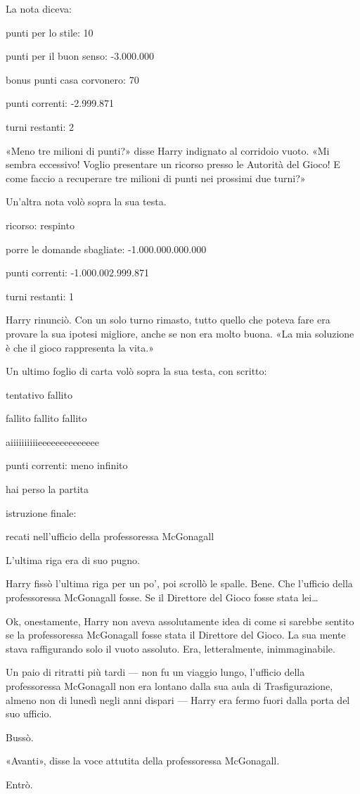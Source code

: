 La nota diceva:

punti per lo stile: 10

punti per il buon senso: -3.000.000

bonus punti casa corvonero: 70

punti correnti: -2.999.871

turni restanti: 2

«Meno tre milioni di punti?» disse Harry indignato al corridoio vuoto. «Mi sembra eccessivo! Voglio presentare un ricorso presso le Autorità del Gioco! E come faccio a recuperare tre milioni di punti nei prossimi due turni?»

Un’altra nota volò sopra la sua testa.

ricorso: respinto

porre le domande sbagliate: -1.000.000.000.000

punti correnti: -1.000.002.999.871

turni restanti: 1

Harry rinunciò. Con un solo turno rimasto, tutto quello che poteva fare era provare la sua ipotesi migliore, anche se non era molto buona. «La mia soluzione è che il gioco rappresenta la vita.»

Un ultimo foglio di carta volò sopra la sua testa, con scritto:

tentativo fallito

fallito fallito fallito

aiiiiiiiiiieeeeeeeeeeeeee

punti correnti: meno infinito

hai perso la partita

istruzione finale:

recati nell’ufficio della professoressa McGonagall

L’ultima riga era di suo pugno.

Harry fissò l’ultima riga per un po’, poi scrollò le spalle. Bene. Che l’ufficio della professoressa McGonagall fosse. Se il Direttore del Gioco fosse stata lei…

Ok, onestamente, Harry non aveva assolutamente idea di come si sarebbe sentito se la professoressa McGonagall fosse stata il Direttore del Gioco. La sua mente stava raffigurando solo il vuoto assoluto. Era, letteralmente, inimmaginabile.

Un paio di ritratti più tardi — non fu un viaggio lungo, l’ufficio della professoressa McGonagall non era lontano dalla sua aula di Trasfigurazione, almeno non di lunedì negli anni dispari — Harry era fermo fuori dalla porta del suo ufficio.

Bussò.

«Avanti», disse la voce attutita della professoressa McGonagall.

Entrò.



